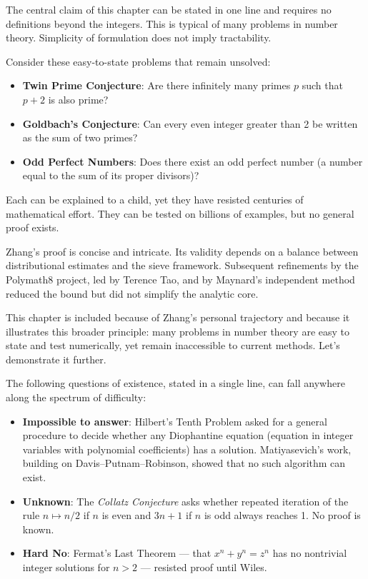 \begin{commentary}
The central claim of this chapter can be stated in one line and requires no definitions beyond the integers. This is typical of many problems in number theory. Simplicity of formulation does not imply tractability.

Consider these easy-to-state problems that remain unsolved:
\begin{itemize}
\item \textbf{Twin Prime Conjecture}: Are there infinitely many primes $p$ such that $p+2$ is also prime?
\item \textbf{Goldbach's Conjecture}: Can every even integer greater than 2 be written as the sum of two primes?
\item \textbf{Odd Perfect Numbers}: Does there exist an odd perfect number (a number equal to the sum of its proper divisors)?
\end{itemize}

Each can be explained to a child, yet they have resisted centuries of mathematical effort. They can be tested on billions of examples, but no general proof exists.

Zhang's proof is concise and intricate. Its validity depends on a balance between distributional estimates and the sieve framework. Subsequent refinements by the Polymath8 project, led by Terence Tao, and by Maynard's independent method reduced the bound but did not simplify the analytic core.

This chapter is included because of Zhang's personal trajectory and because it illustrates this broader principle: many problems in number theory are easy to state and test numerically, yet remain inaccessible to current methods. Let's demonstrate it further.

The following questions of existence, stated in a single line, can fall anywhere along the spectrum of difficulty:

\begin{itemize}
\item \textbf{Impossible to answer}: Hilbert's Tenth Problem asked for a general procedure to decide whether any Diophantine equation (equation in integer variables with polynomial coefficients) has a solution. Matiyasevich's work, building on Davis–Putnam–Robinson, showed that no such algorithm can exist.
\item \textbf{Unknown}: The \textit{Collatz Conjecture} asks whether repeated iteration of the rule $n \mapsto n/2$ if $n$ is even and $3n+1$ if $n$ is odd always reaches 1. No proof is known.
\item \textbf{Hard No}: Fermat’s Last Theorem — that $x^n+y^n=z^n$ has no nontrivial integer solutions for $n>2$ — resisted proof until Wiles.
\end{itemize}

\end{commentary}
